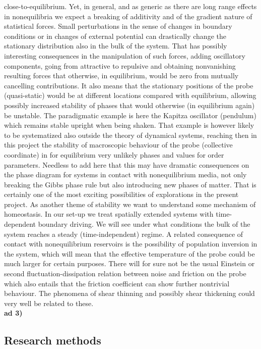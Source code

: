 close-to-equilibrium.   Yet, in general, and as generic as there are long range effects in nonequilibria we expect a breaking of additivity and of the gradient nature of statistical forces. Small perturbations in the sense of changes in boundary conditions or in changes of external potential can drastically change the stationary distribution also in the bulk of the system.  That has possibly interesting consequences in the manipulation of such forces, adding oscillatory components, going from attractive to repulsive and obtaining nonvanishing resulting forces that otherwise, in equilibrium, would be zero from mutually cancelling contributions. 
It also means that the stationary positions of the probe (quasi-static) would be at different locations compared with equilibrium, allowing possibly increased stability of phases that would otherwise (in equilibrium again) be unstable.  The paradigmatic example is here the Kapitza oscillator (pendulum) which remains stable upright when being shaken.  That example is however likely to be systematized also outside the theory of dynamical systems, reaching then in this project the stability of macroscopic behaviour of the probe (collective coordinate) in for equilibrium very unlikely phases and values for order parameters.  Needless to  add here that this may have dramatic consequences on the phase diagram for systems in contact with nonequilibrium media, not only breaking the Gibbs phase rule but also introducing new phases of matter.  That is certainly one of the most exciting possibilities of explorations in the present project. As another theme of stability we want to understand some mechanism of homeostasis. In our set-up we treat spatially extended systems with time-dependent boundary driving. We will see under what conditions the bulk of the system reaches a steady (time-independent) regime. A related consequence of contact with nonequilibrium reservoirs is the possibility of population inversion in the system, which will mean that the effective temperature of the probe could be much larger for certain purposes.  There will for sure not be the usual Einstein or second fluctuation-dissipation relation between noise and friction on the probe which also entails that the friction coefficient can show further nontrivial behaviour.  The phenomena of shear thinning and possibly shear thickening could very well be related to these.\\
{\bf ad 3)} 



\subsection{Research methods}\label{sec:methods}

